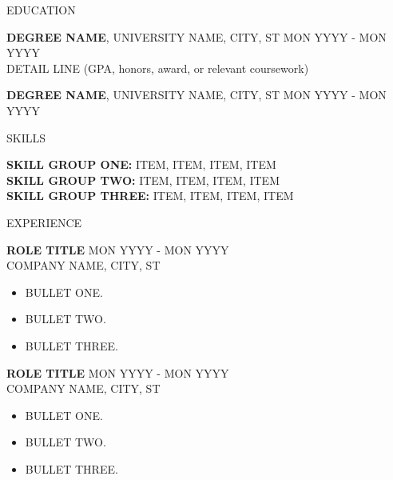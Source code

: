 \documentclass{resume} %
\begin{document}
\ifdefined\pdfinterwordspaceon\pdfinterwordspaceon\fi

\begin{rSection}{EDUCATION}

{\bf DEGREE NAME}, UNIVERSITY NAME, CITY, ST \textbar{} MON YYYY - MON YYYY\\
DETAIL LINE (GPA, honors, award, or relevant coursework)

{\bf DEGREE NAME}, UNIVERSITY NAME, CITY, ST \textbar{} MON YYYY - MON YYYY

\end{rSection}

\begin{rSection}{SKILLS}

\textbf{SKILL GROUP ONE:} ITEM, ITEM, ITEM, ITEM\\
\textbf{SKILL GROUP TWO:} ITEM, ITEM, ITEM, ITEM\\
\textbf{SKILL GROUP THREE:} ITEM, ITEM, ITEM, ITEM

\end{rSection}

\begin{rSection}{EXPERIENCE}

\textbf{ROLE TITLE} \textbar{} MON YYYY - MON YYYY\\
COMPANY NAME, CITY, ST
 \begin{itemize}
    \itemsep -3pt
     \item BULLET ONE.
     \item BULLET TWO.
     \item BULLET THREE.
 \end{itemize}

\textbf{ROLE TITLE} \textbar{} MON YYYY - MON YYYY\\
COMPANY NAME, CITY, ST
 \begin{itemize}
    \itemsep -3pt
     \item BULLET ONE.
     \item BULLET TWO.
     \item BULLET THREE.
 \end{itemize}

\end{rSection}
\end{document}
